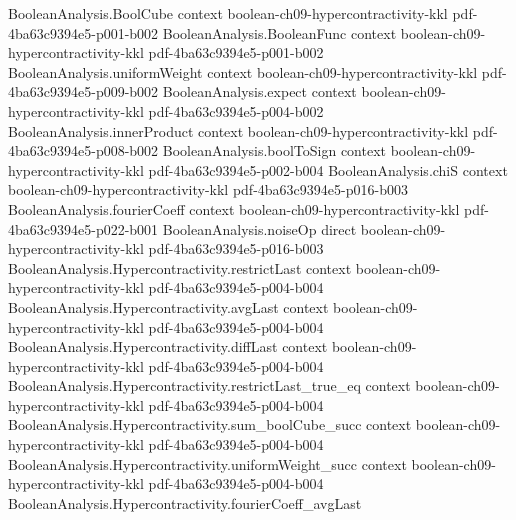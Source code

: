 \begin{theorem}
\label{BooleanAnalysis.Hypercontractivity.hypercontractivity_2_4}
\leanok
{}
\proofstep
  {BooleanAnalysis.BoolCube}
  {context}
  {boolean-ch09-hypercontractivity-kkl}
  {pdf-4ba63c9394e5-p001-b002}
\proofstep
  {BooleanAnalysis.BooleanFunc}
  {context}
  {boolean-ch09-hypercontractivity-kkl}
  {pdf-4ba63c9394e5-p001-b002}
\proofstep
  {BooleanAnalysis.uniformWeight}
  {context}
  {boolean-ch09-hypercontractivity-kkl}
  {pdf-4ba63c9394e5-p009-b002}
\proofstep
  {BooleanAnalysis.expect}
  {context}
  {boolean-ch09-hypercontractivity-kkl}
  {pdf-4ba63c9394e5-p004-b002}
\proofstep
  {BooleanAnalysis.innerProduct}
  {context}
  {boolean-ch09-hypercontractivity-kkl}
  {pdf-4ba63c9394e5-p008-b002}
\proofstep
  {BooleanAnalysis.boolToSign}
  {context}
  {boolean-ch09-hypercontractivity-kkl}
  {pdf-4ba63c9394e5-p002-b004}
\proofstep
  {BooleanAnalysis.chiS}
  {context}
  {boolean-ch09-hypercontractivity-kkl}
  {pdf-4ba63c9394e5-p016-b003}
\proofstep
  {BooleanAnalysis.fourierCoeff}
  {context}
  {boolean-ch09-hypercontractivity-kkl}
  {pdf-4ba63c9394e5-p022-b001}
\proofstep
  {BooleanAnalysis.noiseOp}
  {direct}
  {boolean-ch09-hypercontractivity-kkl}
  {pdf-4ba63c9394e5-p016-b003}
\proofstep
  {BooleanAnalysis.Hypercontractivity.restrictLast}
  {context}
  {boolean-ch09-hypercontractivity-kkl}
  {pdf-4ba63c9394e5-p004-b004}
\proofstep
  {BooleanAnalysis.Hypercontractivity.avgLast}
  {context}
  {boolean-ch09-hypercontractivity-kkl}
  {pdf-4ba63c9394e5-p004-b004}
\proofstep
  {BooleanAnalysis.Hypercontractivity.diffLast}
  {context}
  {boolean-ch09-hypercontractivity-kkl}
  {pdf-4ba63c9394e5-p004-b004}
\proofstep
  {BooleanAnalysis.Hypercontractivity.restrictLast_true_eq}
  {context}
  {boolean-ch09-hypercontractivity-kkl}
  {pdf-4ba63c9394e5-p004-b004}
\proofstep
  {BooleanAnalysis.Hypercontractivity.sum_boolCube_succ}
  {context}
  {boolean-ch09-hypercontractivity-kkl}
  {pdf-4ba63c9394e5-p004-b004}
\proofstep
  {BooleanAnalysis.Hypercontractivity.uniformWeight_succ}
  {context}
  {boolean-ch09-hypercontractivity-kkl}
  {pdf-4ba63c9394e5-p004-b004}
\proofstep
  {BooleanAnalysis.Hypercontractivity.fourierCoeff_avgLast}

\end{theorem}

